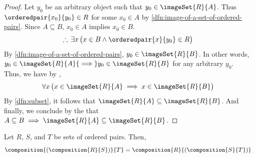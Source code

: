 \begin{proof}
    Let \( y_{0} \) be an arbitrary object such that \( y_{0} \in \imageSet{R}{A} \). Thus
    \( \orderedpair{x_{0}}{y_{0}} \in R \) for some \( x_{0} \in A \) by \cref{dfn:image-of-a-set-of-ordered-pairs}.
    Since \( A \subseteq B \), \( x_{0} \in A \) implies \( x_{0} \in B \).
    \begin{equation*}
        \therefore \, \exists x \, \big( x \in B \land \orderedpair{x}{y_{0}} \in R \big)
    \end{equation*}
    By \cref{dfn:image-of-a-set-of-ordered-pairs}, \( y_{0} \in \imageSet{R}{B} \). In other words,
    \( y_{0} \in \imageSet{R}{A} {\implies} y_{0} \in \imageSet{R}{B} \) for any arbitrary \( y_{0} \).
    Thus, we have by ,
    \begin{equation*}
        \forall x \, \big( x \in \imageSet{R}{A} \implies x \in \imageSet{R}{B} \big)
    \end{equation*}
    By \cref{dfn:subset}, it follows that \( \imageSet{R}{A} \subseteq \imageSet{R}{B} \).
    And finally, we conclude by the  that
    \( A \subseteq B \implies \imageSet{R}{A} \subseteq \imageSet{R}{B} \).
\end{proof}

\begin{thm}[Associativity]
    \label{thm:associativity-of-composition}
    Let \( R \), \( S \), and \( T \) be sets of ordered pairs. Then,
    \begin{equation*}
        \composition{\mleft( \composition{R}{S} \mright)}{T} = \composition{R}{\mleft( \composition{S}{T} \mright)}
    \end{equation*}
\end{thm}

